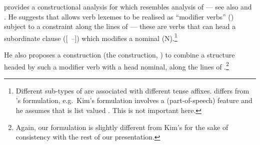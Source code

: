 \documentclass[output=paper,biblatex,babelshorthands,newtxmath,draftmode,colorlinks,citecolor=brown]{langscibook}
\begin{document}
\citet{Kim16SyntacticStrKorean} provides a constructional analysis for  which
resembles  analysis of  --- see also  and
. He suggests that  allows verb lexemes
to be realised as ``modifier verbs'' () subject to a constraint along the
lines of  --- these are verbs that can head a subordinate clause ([~{--}])
which modifies a nominal (N).\footnote{Different sub-types of  are associated
  with different tense affixes.  differs from
  \citeauthor{Kim16SyntacticStrKorean}'s formulation, e.g.\ Kim's formulation involves a
   (part-of-speech) feature and he assumes that  is list valued
  \citep[see][285]{Kim16SyntacticStrKorean}. This is not important here.}

\begin{exe}\ex\label{x:rc-86}
\end{exe}
He   also   proposes   a  construction   (the     construction,
\citealt[see][290]{Kim16SyntacticStrKorean})  to  combine a  structure  headed  by such  a
modifier verb  with a head  nominal, along  the lines of  .\footnote{Again, our
  formulation is slightly different from Kim's for  the sake of consistency with the rest of
  our presentation. }

\begin{exe}\ex\label{x:rc-87}
%
\end{exe}
\end{document}
